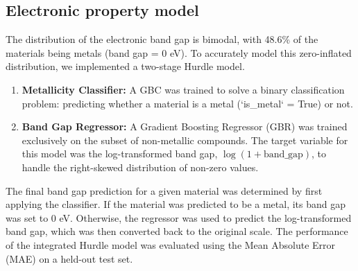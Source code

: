 \documentclass[]{article}
\begin{document}
\subsection{Electronic property model}
The distribution of the electronic band gap is bimodal, with 48.6\% of the materials being metals (band gap = 0 eV). To accurately model this zero-inflated distribution, we implemented a two-stage Hurdle model.
\begin{enumerate}
    \item \textbf{Metallicity Classifier:} A GBC was trained to solve a binary classification problem: predicting whether a material is a metal (`is\_metal` = True) or not.
    \item \textbf{Band Gap Regressor:} A Gradient Boosting Regressor (GBR) was trained exclusively on the subset of non-metallic compounds. The target variable for this model was the log-transformed band gap, $\log(1 + \text{band\_gap})$, to handle the right-skewed distribution of non-zero values.
\end{enumerate}
The final band gap prediction for a given material was determined by first applying the classifier. If the material was predicted to be a metal, its band gap was set to 0 eV. Otherwise, the regressor was used to predict the log-transformed band gap, which was then converted back to the original scale. The performance of the integrated Hurdle model was evaluated using the Mean Absolute Error (MAE) on a held-out test set.
\end{document}

